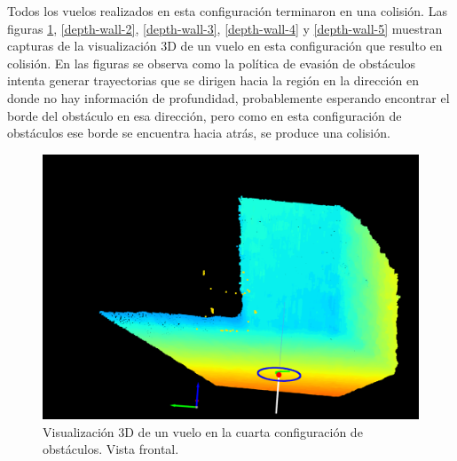 Todos los vuelos realizados en esta configuración terminaron en una colisión. Las figuras \ref{depth-wall-1}, \ref{depth-wall-2}, \ref{depth-wall-3}, \ref{depth-wall-4} y \ref{depth-wall-5} muestran capturas de la visualización 3D de un vuelo en esta configuración que resulto en colisión. En las figuras se observa como la política de evasión de obstáculos intenta generar trayectorias que se dirigen hacia la región en la dirección  en donde no hay información de profundidad, probablemente esperando encontrar el borde del obstáculo en esa dirección, pero como en esta configuración de obstáculos ese borde se encuentra hacia atrás, se produce una colisión.

\begin{figure}[H]
    \centering
    \includegraphics[scale=0.23]{partes/img/depth-wall-1-front.png}
    \caption[Visualización 3D de un vuelo en la cuarta configuración de obstáculos. Vista frontal.]{Visualización 3D de un vuelo en la cuarta configuración de obstáculos. Vista frontal.}
    \label{depth-wall-1}
\end{figure}

